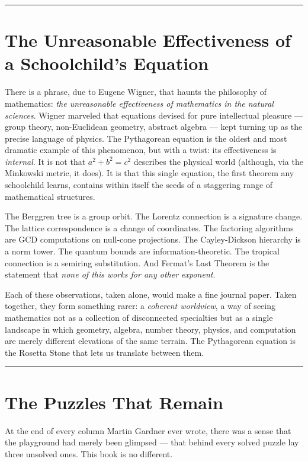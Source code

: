 \bigskip\noindent\rule{\linewidth}{0.4pt}\bigskip

\section*{The Unreasonable Effectiveness of a Schoolchild's Equation}
There is a phrase, due to Eugene Wigner, that haunts the philosophy of mathematics: \emph{the unreasonable effectiveness of mathematics in the natural sciences}. Wigner marveled that equations devised for pure intellectual pleasure --- group theory, non-Euclidean geometry, abstract algebra --- kept turning up as the precise language of physics. The Pythagorean equation is the oldest and most dramatic example of this phenomenon, but with a twist: its effectiveness is \emph{internal}. It is not that \(a^2 + b^2 = c^2\) describes the physical world (although, via the Minkowski metric, it does). It is that this single equation, the first theorem any schoolchild learns, contains within itself the seeds of a staggering range of mathematical structures.

The Berggren tree is a group orbit. The Lorentz connection is a signature change. The lattice correspondence is a change of coordinates. The factoring algorithms are GCD computations on null-cone projections. The Cayley-Dickson hierarchy is a norm tower. The quantum bounds are information-theoretic. The tropical connection is a semiring substitution. And Fermat's Last Theorem is the statement that \emph{none of this works for any other exponent}.

Each of these observations, taken alone, would make a fine journal paper. Taken together, they form something rarer: a \emph{coherent worldview}, a way of seeing mathematics not as a collection of disconnected specialties but as a single landscape in which geometry, algebra, number theory, physics, and computation are merely different elevations of the same terrain. The Pythagorean equation is the Rosetta Stone that lets us translate between them.

\bigskip\noindent\rule{\linewidth}{0.4pt}\bigskip

\section*{The Puzzles That Remain}
At the end of every column Martin Gardner ever wrote, there was a sense that the playground had merely been glimpsed --- that behind every solved puzzle lay three unsolved ones. This book is no different.

